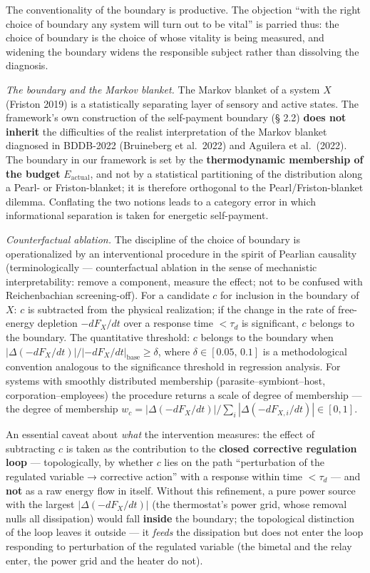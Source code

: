 \documentclass[pdflatex,sn-mathphys-ay]{sn-jnl}
\begin{document}
The conventionality of the boundary is productive. The objection ``with the right choice of boundary any system will turn out to be vital'' is parried thus: the choice of boundary is the choice of whose vitality is being measured, and widening the boundary widens the responsible subject rather than dissolving the diagnosis.

\emph{The boundary and the Markov blanket.} The Markov blanket of a system \(X\) (Friston 2019) is a statistically separating layer of sensory and active states. The framework's own construction of the self-payment boundary (§ 2.2) \textbf{does not inherit} the difficulties of the realist interpretation of the Markov blanket diagnosed in BDDB-2022 (Bruineberg et al.~2022) and Aguilera et al.~(2022). The boundary in our framework is set by the \textbf{thermodynamic membership of the budget} \(E_{\text{actual}}\), and not by a statistical partitioning of the distribution along a Pearl- or Friston-blanket; it is therefore orthogonal to the Pearl/Friston-blanket dilemma. Conflating the two notions leads to a category error in which informational separation is taken for energetic self-payment.

\emph{Counterfactual ablation.} The discipline of the choice of boundary is operationalized by an interventional procedure in the spirit of Pearlian causality (terminologically --- counterfactual ablation in the sense of mechanistic interpretability: remove a component, measure the effect; not to be confused with Reichenbachian screening-off). For a candidate \(c\) for inclusion in the boundary of \(X\): \(c\) is subtracted from the physical realization; if the change in the rate of free-energy depletion \(-dF_X/dt\) over a response time \(< \tau_d\) is significant, \(c\) belongs to the boundary. The quantitative threshold: \(c\) belongs to the boundary when \(|\Delta(-dF_X/dt)| / |-dF_X/dt|_{\text{base}} \ge \delta\), where \(\delta \in [0.05,\, 0.1]\) is a methodological convention analogous to the significance threshold in regression analysis. For systems with smoothly distributed membership (parasite--symbiont--host, corporation--employees) the procedure returns a scale of degree of membership --- the degree of membership \(w_c = |\Delta(-dF_X/dt)| / \sum_i |\Delta(-dF_{X,i}/dt)| \in [0, 1]\).

An essential caveat about \emph{what} the intervention measures: the effect of subtracting \(c\) is taken as the contribution to the \textbf{closed corrective regulation loop} --- topologically, by whether \(c\) lies on the path ``perturbation of the regulated variable → corrective action'' with a response within time \(< \tau_d\) --- and \textbf{not} as a raw energy flow in itself. Without this refinement, a pure power source with the largest \(|\Delta(-dF_X/dt)|\) (the thermostat's power grid, whose removal nulls all dissipation) would fall \textbf{inside} the boundary; the topological distinction of the loop leaves it outside --- it \emph{feeds} the dissipation but does not enter the loop responding to perturbation of the regulated variable (the bimetal and the relay enter, the power grid and the heater do not).
\end{document}
